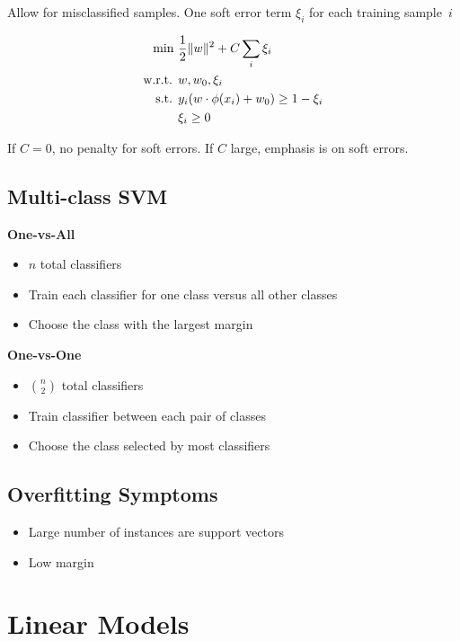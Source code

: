 \documentclass[10pt]{article}
\DeclarePairedDelimiter{\norm}{\lVert}{\rVert}
\begin{document}
\begin{multicols}{3}
  Allow for misclassified samples.  One soft error term $\xi_i$ for each training sample~$i$

  \begin{align*}
    \text{min }    &\frac{1}{2}\norm{w}^{2} + C\sum_i\xi_i \\
    \text{w.r.t. } &w,w_0, \xi_i \\
    \text{s.t. }   &y_i(w\cdot \phi(x_i) +w_0) \geq 1-\xi_i \\
                   &\xi_i \geq 0
  \end{align*}

  If $C=0$, no penalty for soft errors.  If $C$ large, emphasis is on soft errors.

  \subsection*{Multi-class SVM}

  \textbf{One-vs-All}
  \begin{itemize}
    \item $n$ total classifiers
    \item Train each classifier for one class versus all other classes
    \item Choose the class with the largest margin
  \end{itemize}

  \textbf{One-vs-One}
  \begin{itemize}
    \item $\binom{n}{2}$ total classifiers
    \item Train classifier between each pair of classes
    \item Choose the class selected by most classifiers
  \end{itemize}

  \subsection*{Overfitting Symptoms}

  \begin{itemize}
    \item Large number of instances are support vectors
    \item Low margin
  \end{itemize}

  \section{Linear Models}


\end{multicols}
\end{document}

